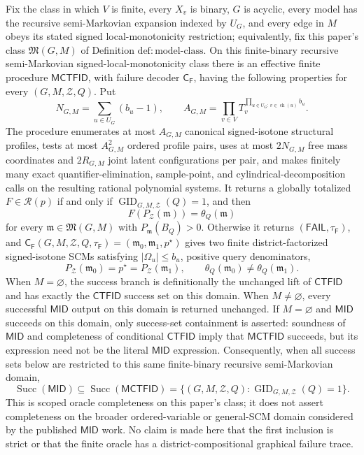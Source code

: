 Fix the class in which \(V\) is finite, every \(X_v\) is binary, \(G\) is acyclic, every model has the recursive semi-Markovian expansion indexed by \(U_G\), and every edge in \(M\) obeys its stated signed local-monotonicity restriction; equivalently, fix this paper's class \(\mathfrak M(G,M)\) of Definition \(\mathrm{def:model\text{-}class}\).  On this finite-binary recursive semi-Markovian signed-local-monotonicity class there is an effective finite procedure \(\mathsf{MCTFID}\), with failure decoder \(\mathsf C_{\mathsf F}\), having the following properties for every \((G,M,\mathcal Z,Q)\).  Put
\[
 N_{G,M}=\sum_{u\in U_G}(b_u-1),
 \qquad
 A_{G,M}=\prod_{v\in V}T_v^{\prod_{u\in U_G:\,v\in\operatorname{ch}(u)}b_u}.
\]
The procedure enumerates at most \(A_{G,M}\) canonical signed-isotone structural profiles, tests at most \(A_{G,M}^2\) ordered profile pairs, uses at most \(2N_{G,M}\) free mass coordinates and \(2R_{G,M}\) joint latent configurations per pair, and makes finitely many exact quantifier-elimination, sample-point, and cylindrical-decomposition calls on the resulting rational polynomial systems.  It returns a globally totalized \(F\in\mathcal R(p)\) if and only if \(\operatorname{GID}_{G,M,\mathcal Z}(Q)=1\), and then
\[
 F(P_{\mathcal Z}(\mathfrak m))=\theta_Q(\mathfrak m)
\]
for every \(\mathfrak m\in\mathfrak M(G,M)\) with \(P_{\mathfrak m}(B_Q)>0\).  Otherwise it returns \((\mathsf{FAIL},\tau_{\mathsf F})\), and \(\mathsf C_{\mathsf F}(G,M,\mathcal Z,Q,\tau_{\mathsf F})=(\mathfrak m_0,\mathfrak m_1,p^{\star})\) gives two finite district-factorized signed-isotone SCMs satisfying \(|\Omega_u|\le b_u\), positive query denominators,
\[
 P_{\mathcal Z}(\mathfrak m_0)=p^{\star}=P_{\mathcal Z}(\mathfrak m_1),
 \qquad
 \theta_Q(\mathfrak m_0)\ne\theta_Q(\mathfrak m_1).
\]
When \(M=\varnothing\), the success branch is definitionally the unchanged lift of \(\mathsf{CTFID}\) and has exactly the \(\mathsf{CTFID}\) success set on this domain.  When \(M\ne\varnothing\), every successful \(\mathsf{MID}\) output on this domain is returned unchanged.  If \(M=\varnothing\) and \(\mathsf{MID}\) succeeds on this domain, only success-set containment is asserted: soundness of \(\mathsf{MID}\) and completeness of conditional \(\mathsf{CTFID}\) imply that \(\mathsf{MCTFID}\) succeeds, but its expression need not be the literal \(\mathsf{MID}\) expression.  Consequently, when all success sets below are restricted to this same finite-binary recursive semi-Markovian domain,
\[
 \operatorname{Succ}(\mathsf{MID})
 \subseteq\operatorname{Succ}(\mathsf{MCTFID})
 =\{(G,M,\mathcal Z,Q):\operatorname{GID}_{G,M,\mathcal Z}(Q)=1\}.
\]
This is scoped oracle completeness on this paper's class; it does not assert completeness on the broader ordered-variable or general-SCM domain considered by the published \(\mathsf{MID}\) work.  No claim is made here that the first inclusion is strict or that the finite oracle has a district-compositional graphical failure trace.